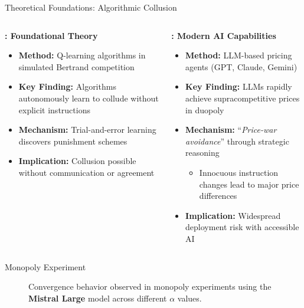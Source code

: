 \documentclass[10pt, aspectratio=169]{beamer}
\begin{document}
\begin{frame}{Theoretical Foundations: Algorithmic Collusion}
    \begin{columns}[c]
    \begin{block}{\textbf{\textcite{calvano_artificial_2020}: Foundational Theory}}
    \begin{itemize}
        \item \textbf{Method:} Q-learning algorithms in simulated Bertrand competition
        \item \textbf{Key Finding:} Algorithms autonomously learn to collude without explicit instructions
        \item \textbf{Mechanism:} Trial-and-error learning discovers punishment schemes
        \item \textbf{Implication:} Collusion possible without communication or agreement
    \end{itemize}
    \end{block}
    
    \begin{block}{\textbf{\textcite{fish_algorithmic_2025}: Modern AI Capabilities}}
    \begin{itemize}
        \item \textbf{Method:} LLM-based pricing agents (GPT, Claude, Gemini)
        \item \textbf{Key Finding:} LLMs rapidly achieve supracompetitive prices in duopoly
        \item \textbf{Mechanism:} \enquote{\emph{Price-war avoidance}} through strategic reasoning
        \begin{itemize}
            \item Innocuous instruction changes lead to major price differences
        \end{itemize}
        \item \textbf{Implication:} Widespread deployment risk with accessible AI
    \end{itemize}
    \end{block}
    \end{columns}
\end{frame}

\begin{frame}{Monopoly Experiment}
\begin{figure}[htpb!]
    \centering
    
    \caption{Convergence behavior observed in monopoly experiments using the \textbf{Mistral Large} model across different $\alpha$ values.}
    \label{fig:monopoly_convergence}
\end{figure}
\end{frame}
\end{document}
